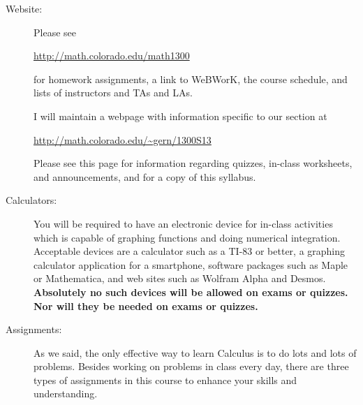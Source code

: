 \documentclass[11pt]{article}
\begin{document}
\begin{description}
  
\item[Website:] Please see
  \begin{center}
    \url{http://math.colorado.edu/math1300}
  \end{center}
  for homework assignments, a link to WeBWorK, the course schedule,
  and lists of instructors and TAs and LAs.

  I will maintain a webpage with information specific to our section
  at
  \begin{center}
    \url{http://math.colorado.edu/~gern/1300S13}
  \end{center}
  Please see this page for information regarding quizzes, in-class
  worksheets, and announcements, and for a copy of this syllabus.

\item[Calculators:] You will be required to have an electronic device
  for in-class activities which is capable of graphing functions and
  doing numerical integration. Acceptable devices are a calculator
  such as a TI-83 or better, a graphing calculator application for a
  smartphone, software packages such as Maple or Mathematica, and web
  sites such as Wolfram Alpha and Desmos.  \textbf{Absolutely no such
    devices will be allowed on exams or quizzes. Nor will they be
    needed on exams or quizzes.}

\item[Assignments:] As we said, the only effective way to learn
  Calculus is to do lots and lots of problems.  Besides working on
  problems in class every day, there are three types of assignments in
  this course to enhance your skills and understanding.


\end{description}
\end{document}
